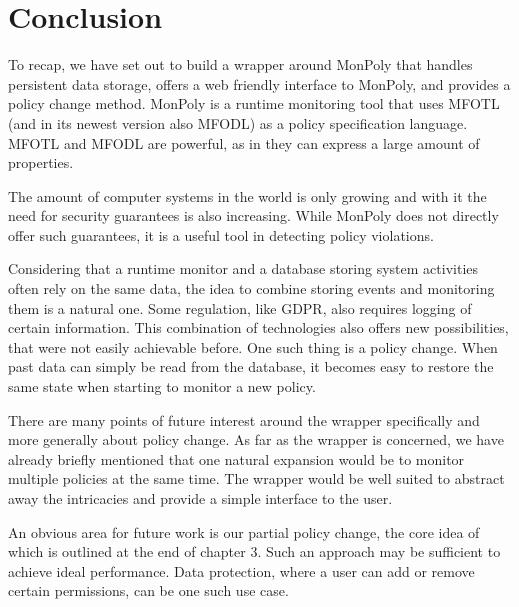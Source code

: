 \chapter{Conclusion}

To recap, we have set out to build a wrapper around MonPoly that handles persistent data storage, offers a web friendly interface to MonPoly, and provides a policy change method.
MonPoly is a runtime monitoring tool that uses MFOTL (and in its newest version also MFODL) as a policy specification language.
MFOTL and MFODL are powerful, as in they can express a large amount of properties.

The amount of computer systems in the world is only growing and with it the need for security guarantees is also increasing.
While MonPoly does not directly offer such guarantees, it is a useful tool in detecting policy violations.

Considering that a runtime monitor and a database storing system activities often rely on the same data, the idea to combine storing events and monitoring them is a natural one.
Some regulation, like GDPR, also requires logging of certain information.
This combination of technologies also offers new possibilities, that were not easily achievable before.
One such thing is a policy change.
When past data can simply be read from the database, it becomes easy to restore the same state when starting to monitor a new policy.

There are many points of future interest around the wrapper specifically and more generally about policy change.
As far as the wrapper is concerned, we have already briefly mentioned that one natural expansion would be to monitor multiple policies at the same time.
The wrapper would be well suited to abstract away the intricacies and provide a simple interface to the user.

An obvious area for future work is our partial policy change, the core idea of which is outlined at the end of chapter 3.
Such an approach may be sufficient to achieve ideal performance.
Data protection, where a user can add or remove certain permissions, can be one such use case.
